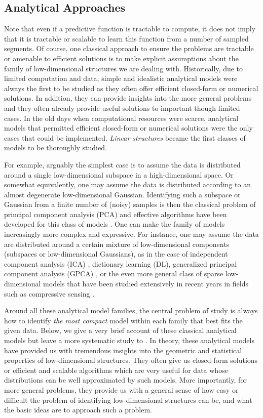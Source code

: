 \documentclass[../../book-main.tex]{subfiles}
\begin{document}
\subsection{Analytical Approaches}
\label{sec:analytical}
Note that even if a predictive function is tractable to compute, it does not imply that it is tractable or scalable to learn this function from a number of sampled segments. Of course, one classical approach to ensure the problems are tractable or amenable to efficient solutions is to make explicit assumptions about the family of low-dimensional structures we are dealing with. Historically, due to limited computation and data, simple and idealistic analytical models were always the first to be studied as they often offer efficient closed-form or numerical solutions. In addition, they can provide insights into the more general problems and they often already provide useful solutions to important though limited cases. In the old days when computational resources were scarce, analytical models that permitted efficient closed-form or numerical solutions were the only cases that could be implemented. {\em Linear structures} became the first classes of models to be thoroughly studied.

For example, arguably the simplest case is to assume the data is distributed around a single low-dimensional subspace in a high-dimensional space. Or somewhat equivalently, one may assume the data is distributed according to an almost degenerate low-dimensional Gaussian. Identifying such a subspace or Gaussian from a finite number of (noisy) samples is then the classical problem of principal component analysis (PCA) and  effective algorithms have been developed for this class of models \cite{JolliffeI2002}. One can make the family of models increasingly more complex and expressive. For instance, one may assume the data are distributed around a certain mixture of low-dimensional components (subspaces or low-dimensional Gaussians), as in the case of independent component analysis (ICA) \cite{Ans-1985}, dictionary learning (DL), generalized principal component analysis (GPCA) \cite{Vidal-GPCA}, or the even more general class of sparse low-dimensional models that have been studied extensively in recent years in fields such as compressive sensing \cite{Wright-Ma-2022}. 

Around all these analytical model families, the central problem of study is always how to identify {\em the most compact} model within each family that best fits the given data. Below, we give a very brief account of these classical analytical models but leave a more systematic study to . In theory, these analytical models have provided us with tremendous insights into the geometric and statistical properties of low-dimensional structures. They often give us closed-form solutions or efficient and scalable algorithms which are very useful for data whose distributions can be well approximated by such models. More importantly, for more general problems, they provide us with a general sense of how easy or difficult the problem of identifying low-dimensional structures can be, and what the basic ideas are to approach such a problem.
\end{document}
